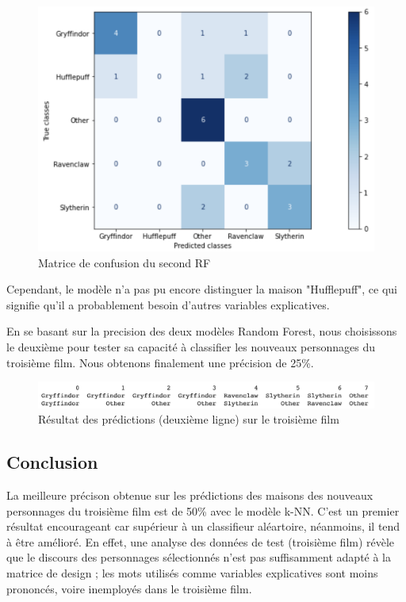 \documentclass[11pt]{article}
\begin{document}
\begin{center}
\begin{figure}[hbt!]
    \centering
    \includegraphics[width = 11 cm]{figures/matriceconfRF2.png}
    \caption{Matrice de confusion du second RF}
    \label{confRF2}
\end{figure}
\FloatBarrier

Cependant, le modèle n'a pas pu encore distinguer la maison "Hufflepuff", ce qui signifie qu'il a probablement besoin d'autres variables explicatives.\par

En se basant sur la precision des deux modèles Random Forest, nous choisissons le deuxième pour tester sa capacité à classifier les nouveaux personnages du troisième film. Nous obtenons finalement une précision de 25\%.

\begin{figure}[hbt!]
    \centering
    \includegraphics[width = 16 cm]{figures/finalresults.png}
    \caption{Résultat des prédictions (deuxième ligne) sur le troisième film}
    \label{finalresult}
\end{figure}
\FloatBarrier

\subsection{Conclusion}

La meilleure précison obtenue sur les prédictions des maisons des nouveaux personnages du troisième film est de 50\% avec le modèle k-NN. C'est un premier résultat encourageant car supérieur à un classifieur aléartoire, néanmoins, il tend à être amélioré.
En effet, une analyse des données de test (troisième film) révèle que le discours des personnages sélectionnés n’est pas suffisamment adapté à la matrice de design ; les mots utilisés comme variables explicatives sont moins prononcés, voire inemployés dans le troisième film.


\end{center}
\end{document}
